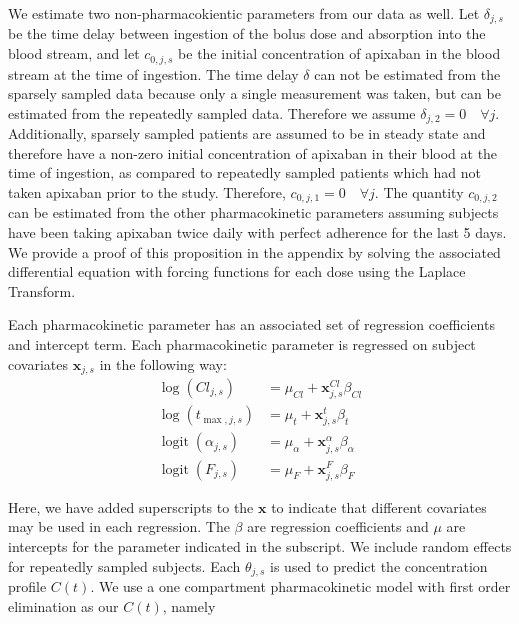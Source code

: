 We estimate two non-pharmacokientic parameters from our data as well.  Let $\delta_{j, s}$ be the time delay between ingestion of the bolus dose and absorption into the blood stream, and let $c_{0, j, s}$ be the initial concentration of apixaban in the blood stream at the time of ingestion.  The time delay $\delta$ can not be estimated from the sparsely sampled data because only a single measurement was taken, but can be estimated from the repeatedly sampled data.  Therefore we assume $\delta_{j, 2}=0 \quad \forall j$.  Additionally, sparsely sampled patients are assumed to be in steady state and therefore have a non-zero initial concentration of apixaban in their blood at the time of ingestion, as compared to repeatedly sampled patients which had not taken apixaban prior to the study.  Therefore, $c_{0, j, 1} = 0 \quad \forall j$.  The quantity $c_{0, j , 2}$ can be estimated from the other pharmacokinetic parameters assuming subjects have been taking apixaban twice daily with perfect adherence for the last 5 days.  We provide a proof of this proposition in the appendix by solving the associated differential equation with forcing functions for each dose using the Laplace Transform.

Each pharmacokinetic parameter has an associated set of regression coefficients and intercept term.  Each pharmacokinetic parameter is regressed on subject covariates $\mathbf{x}_{j, s}$ in the following way:
\begin{align}
 \log(Cl_{j, s}) &= \mu_{Cl} + \mathbf{x}_{j, s}^{Cl} \beta_{Cl}\\
 \log(t_{\max,j, s}) &= \mu_{t} + \mathbf{x}_{j, s}^{t} \beta_{t} \\
 \operatorname{logit}(\alpha_{j, s}) &= \mu_{\alpha} + \mathbf{x}_{j, s}^\alpha \beta_{\alpha}\\
 \operatorname{logit}(F_{j, s}) &= \mu_{F} + \mathbf{x}_{j, s}^{F} \beta_{F}
\end{align}





Here, we have added superscripts to the $\mathbf{x}$ to indicate that different covariates may be used in each regression. The $\beta$ are regression coefficients and $\mu$ are intercepts for the parameter indicated in the subscript. We include random effects for repeatedly sampled subjects. Each $\theta_{j, s}$ is used to predict the concentration profile $C(t)$.  We use a one compartment pharmacokinetic model with first order elimination as our $C(t)$, namely

